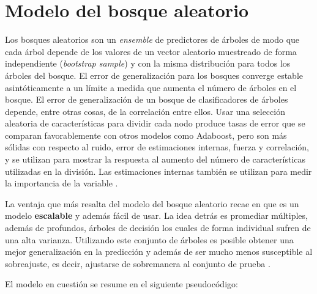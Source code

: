 \section{Modelo del bosque aleatorio}
Los bosques aleatorios son un \textit{ensemble} de predictores de árboles de modo que cada árbol depende de los valores de un vector aleatorio muestreado de forma independiente (\textit{bootstrap sample}) y con la misma distribución para todos los árboles del bosque. 
El error de generalización para los bosques converge estable asintóticamente a un límite a medida que aumenta el número de árboles en el bosque.
El error de generalización de un bosque de clasificadores de árboles depende, entre otras cosas, de la correlación entre ellos. Usar una selección aleatoria de características para dividir cada nodo produce
tasas de error que se comparan favorablemente con otros modelos como Adaboost, pero son más sólidas con respecto al ruido, error de estimaciones internas,
fuerza y correlación, y se utilizan para mostrar la respuesta al aumento del número de características utilizadas
en la división. Las estimaciones internas también se utilizan para medir la importancia de la variable \cite{25}.

La ventaja que más resalta del modelo del bosque aleatorio recae en que es un modelo \textbf{escalable} y además fácil de usar. La idea detrás es promediar múltiples, además de profundos, 
árboles de decisión los cuales de forma individual sufren de una alta varianza. Utilizando este conjunto de árboles es posible obtener una mejor generalización en la predicción y además de ser mucho menos
susceptible al sobreajuste, es decir, ajustarse de sobremanera al conjunto de prueba \cite{24}.

El modelo en cuestión se resume en el siguiente pseudocódigo:

\newcommand{\INDSTATE}[1][1]{\STATE\hspace{#1\algorithmicindent}}

